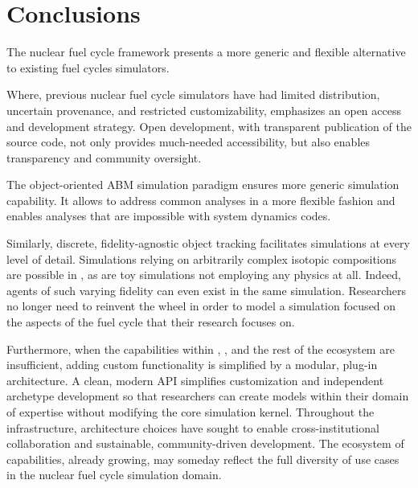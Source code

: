 

\section{Conclusions}


The \Cyclus nuclear fuel cycle framework presents a more generic and flexible 
alternative to existing fuel cycles simulators. 

Where, previous nuclear fuel cycle simulators have had limited distribution, 
uncertain provenance, and restricted customizability, \Cyclus emphasizes an 
open access and development strategy.  Open development, with transparent 
publication of the source code, not only provides much-needed accessibility, 
but also enables transparency and community oversight. 

The object-oriented \acrlong{ABM} simulation paradigm ensures more generic 
simulation capability. It allows \Cyclus to address common analyses in a more 
flexible fashion and enables analyses that are impossible with system dynamics 
codes. 

Similarly, discrete, fidelity-agnostic object tracking facilitates simulations 
at every level of detail. Simulations relying on arbitrarily complex isotopic 
compositions are possible in \Cyclus, as are  toy simulations not employing any 
physics at all. Indeed, agents of such varying fidelity can even exist in the 
same simulation. Researchers no longer need to reinvent the wheel in order to 
model a simulation focused on the aspects of the fuel cycle that their research 
focuses on.

Furthermore, when the capabilities within \Cyclus, \Cycamore, and the rest of 
the ecosystem are insufficient, adding custom functionality is simplified by a 
modular, plug-in architecture. A clean, modern \gls{API} simplifies 
customization and independent archetype development so that researchers can 
create models within their domain of expertise without modifying the core 
simulation kernel. Throughout the \Cyclus 
infrastructure, architecture choices have sought to enable cross-institutional 
collaboration and sustainable, community-driven development. The ecosystem 
of capabilities, already growing, may someday reflect the full diversity of use 
cases in the nuclear fuel cycle simulation domain.


